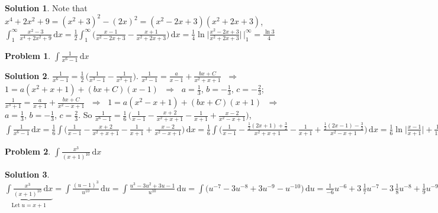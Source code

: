 \documentclass[11pt,a4paper]{article}
\newcommand{\ds}{\displaystyle}
\newcommand{\ie}{\;\Longrightarrow\;}
\theoremstyle{definition}
\newtheorem*{problem}{Problem}
\newtheorem*{solution}{Solution}
\begin{document}
\begin{solution}
  Note that $x^4 + 2x^2 + 9 = (x^2 + 3)^2 - (2x)^2 = (x^2 - 2x + 3)(x^2 + 2x + 3)$, $\ds\int_1^\infty\!\!\frac{x^2 - 3}{x^4 + 2x^2 + 9}\,\text{d}x = \frac{1}{2}\int_1^\infty\!\!\bigg(\frac{x - 1}{x^2 - 2x + 3} - \frac{x + 1}{x^2 + 2x + 3}\bigg)\,\text{d}x = \frac{1}{4}\ln\bigg|\frac{x^2 - 2x + 3}{x^2 + 2x + 3}\bigg|\,\Bigg|_1^\infty = \frac{\ln 3}{4}$
\end{solution}

\begin{problem}
  $\ds\int\!\frac{1}{x^6 - 1}\,\text{d}x$
\end{problem}

\begin{solution}
  $\ds\frac{1}{x^6 - 1} = \frac{1}{2}\,\Big(\frac{1}{x^3 - 1} - \frac{1}{x^3 + 1}\Big)$. $\ds\frac{1}{x^3 - 1} = \frac{a}{x - 1} + \frac{b x + C}{x^2 + x + 1}$ $\ie$ $\ds 1 = a(x^2 + x + 1) + (b x + C)(x - 1)$ $\ie$ $\ds a = \frac{1}{3}$, $\ds b = -\frac{1}{3}$, $\ds c = -\frac{2}{3}$; $\ds\frac{1}{x^3 + 1} = \frac{a}{x + 1} + \frac{b x + C}{x^2 - x + 1}$ $\ie$ $\ds 1 = a(x^2 - x + 1) + (b x + C)(x + 1)$ $\ie$ $\ds a = \frac{1}{3}$, $\ds b = -\frac{1}{3}$, $\ds c = \frac{2}{3}$. So $\ds\frac{1}{x^6 - 1} = \frac{1}{6}\,\bigg(\frac{1}{x - 1} - \frac{x + 2}{x^2 + x + 1} - \frac{1}{x + 1} + \frac{x - 2}{x^2 - x + 1}\bigg)$, $\ds\int\!\frac{1}{x^6 - 1}\,\text{d}x = \frac{1}{6}\int\!\bigg(\frac{1}{x - 1} - \frac{x + 2}{x^2 + x + 1} - \frac{1}{x + 1} + \frac{x - 2}{x^2 - x + 1}\bigg)\,\text{d}x = \frac{1}{6}\int\!\bigg(\frac{1}{x - 1} - \frac{\frac{1}{2}(2x + 1) + \frac{3}{2}}{x^2 + x + 1} - \frac{1}{x + 1} + \frac{\frac{1}{2}(2x - 1) - \frac{3}{2}}{x^2 - x + 1}\bigg)\,\text{d}x = \frac{1}{6}\ln\Big|\frac{x - 1}{x + 1}\Big| + \frac{1}{12}\ln\Big|\frac{x^2 - x + 1}{x^2 + x + 1}\Big| - \frac{1}{2\sqrt{3}}\Big(\tan^{-1}\!\frac{2 x + 1}{\sqrt{3}} + \tan^{-1}\!\frac{2 x - 1}{\sqrt{3}}\Big)$
\end{solution}

\begin{problem}
  $\ds\int\!\frac{x^3}{(x + 1)^{10}}\,\text{d}x$
\end{problem}

\begin{solution}
  $\ds\underbrace{\int\!\frac{x^3}{(x + 1)^{10}}\,\text{d}x}_{\text{Let}\; u = x + 1} = \int\!\frac{(u - 1)^3}{u^{10}}\,\text{d}u = \int\!\frac{u^3 - 3u^2 + 3u - 1}{u^{10}}\,\text{d}u = \int\!\big(u^{-7} - 3u^{-8} + 3u^{-9} - u^{-10}\big)\,\text{d}u = \frac{1}{-6}u^{-6} + 3\,\frac{1}{7}u^{-7} - 3\,\frac{1}{8}u^{-8} + \frac{1}{9}u^{-9} = -\frac{1}{6(x + 1)^6} + \frac{3}{7(x + 1)^7} - \frac{3}{8(x + 1)^8} + \frac{1}{9(x + 1)^9} = -\frac{84x^3 + 36x^2 + 9x + 1}{504\,(x + 1)^9}$
\end{solution}
\end{document}
